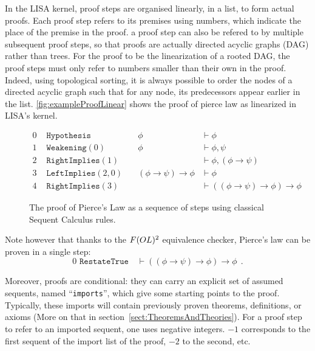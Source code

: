 In the LISA kernel, proof steps are organised linearly, in a list, to form actual proofs. Each proof step refers to its premises using numbers, which indicate the place of the premise in the proof. 
a proof step can also be refered to by multiple subsequent proof steps, so that proofs are actually directed acyclic graphs (DAG) rather than trees. For the proof to be the linearization of a rooted DAG, the proof steps must only refer to numbers smaller than their own in the proof. Indeed, using topological sorting, it is always possible to order the nodes of a directed acyclic graph such that for any node, its predecessors appear earlier in the list. 
\autoref{fig:exampleProofLinear} shows the proof of pierce law as linearized in LISA's kernel.
\begin{figure}[ht]
  \begin{align*}
    0 & \texttt { Hypothesis}       & \quad \phi                     & \vdash \phi                                \\
    1 & \texttt { Weakening}(0)     & \quad  \phi                    & \vdash \phi, \psi                          \\
    2 & \texttt { RightImplies}(1)  & \quad                          & \vdash \phi, (\phi \to \psi)               \\
    3 & \texttt { LeftImplies}(2,0) & \quad (\phi \to \psi) \to \phi & \vdash \phi                                \\
    4 & \texttt { RightImplies}(3)  & \quad                          & \vdash ((\phi \to \psi) \to \phi) \to \phi
  \end{align*}
  \caption{The proof of Pierce's Law as a sequence of steps using classical Sequent Calculus rules.}
  \label{fig:exampleProofLinear}
\end{figure}
\noindent
Note however that thanks to the $F(OL)\textsuperscript{2}$ equivalence checker, Pierce's law can be proven in a single step:
$$
  0  \texttt { RestateTrue}        \quad \vdash ((\phi \to \psi) \to \phi) \to \phi \ \ .
$$

Moreover, proofs are conditional: they can carry an explicit set of assumed sequents, named ``\lstinline{imports}'', which give some starting points to the proof. Typically, these imports will contain previously proven theorems, definitions, or axioms (More on that in section~\ref{sect:TheoremsAndTheories}). For a proof step to refer to an imported sequent, one uses negative integers. $-1$ corresponds to the first sequent of the import list of the proof, $-2$ to the second, etc.

